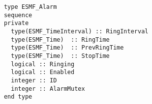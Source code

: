 \begin{verbatim}
      type ESMF_Alarm
      sequence
      private
        type(ESMF_TimeInterval) :: RingInterval
        type(ESMF_Time)  :: RingTime
        type(ESMF_Time)  :: PrevRingTime
        type(ESMF_Time)  :: StopTime
        logical :: Ringing
        logical :: Enabled
        integer :: ID
        integer :: AlarmMutex
      end type
\end{verbatim}
